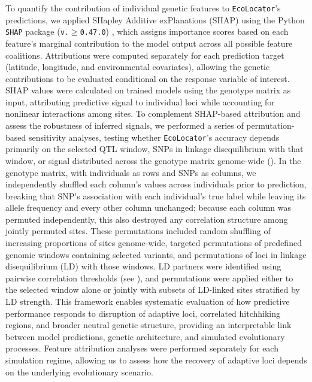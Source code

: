 \documentclass[]{article}
\newcommand{\ecolocator}{\texttt{EcoLocator}\xspace}
\begin{document}
To quantify the contribution of individual genetic features
to \ecolocator's predictions,
we applied SHapley Additive exPlanations (SHAP) using the Python
\texttt{SHAP} package (\texttt{v.$\geq$0.47.0}) \citep{lundberg_shap_2017},
which assigns importance scores
based on each feature's marginal contribution to the model output
across all possible feature coalitions.
Attributions were computed separately for each prediction target
(latitude, longitude, and environmental covariates),
allowing the genetic contributions to be evaluated
conditional on the response variable of interest.
SHAP values were calculated on trained models
using the genotype matrix as input,
attributing predictive signal to individual loci
while accounting for nonlinear interactions among sites.
To complement SHAP-based attribution
and assess the robustness of inferred signals,
we performed a series of permutation-based sensitivity analyses,
testing whether \ecolocator's accuracy depends primarily on the selected QTL window, 
SNPs in linkage disequilibrium with that window, 
or signal distributed across the genotype matrix genome-wide 
().
In the genotype matrix,
with individuals as rows and SNPs as columns,
we independently shuffled each column's values across individuals prior to prediction,
breaking that SNP's association with each individual's true label
while leaving its allele frequency and every other column unchanged;
because each column was permuted independently, this also destroyed any 
correlation structure among jointly permuted sites.
These permutations included random shuffling
of increasing proportions of sites genome-wide,
targeted permutations of predefined genomic windows
containing selected variants,
and permutations of loci in linkage disequilibrium (LD)
with those windows.
LD partners were identified using pairwise correlation thresholds
(see ),
and permutations were applied either to the selected window alone
or jointly with subsets of LD-linked sites
stratified by LD strength.
This framework enables systematic evaluation
of how predictive performance responds to disruption
of adaptive loci, correlated hitchhiking regions,
and broader neutral genetic structure,
providing an interpretable link between model predictions,
genetic architecture, and simulated evolutionary processes.
Feature attribution analyses were performed separately
for each simulation regime,
allowing us to assess how the recovery of adaptive loci
depends on the underlying evolutionary scenario.
\end{document}
